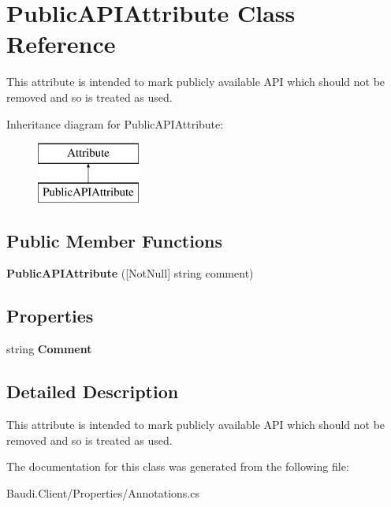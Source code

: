 \hypertarget{class_public_a_p_i_attribute}{}\section{Public\+A\+P\+I\+Attribute Class Reference}
\label{class_public_a_p_i_attribute}


This attribute is intended to mark publicly available A\+P\+I which should not be removed and so is treated as used.  


Inheritance diagram for Public\+A\+P\+I\+Attribute\+:\begin{figure}[H]
\begin{center}
\leavevmode
\includegraphics[height=2.000000cm]{class_public_a_p_i_attribute}
\end{center}
\end{figure}
\subsection*{Public Member Functions}
\begin{DoxyCompactItemize}
\item 
\hypertarget{class_public_a_p_i_attribute_ab00ffb9ccf468541a8f81f85fdee678a}{}{\bfseries Public\+A\+P\+I\+Attribute} (\mbox{[}Not\+Null\mbox{]} string comment)\label{class_public_a_p_i_attribute_ab00ffb9ccf468541a8f81f85fdee678a}

\end{DoxyCompactItemize}
\subsection*{Properties}
\begin{DoxyCompactItemize}
\item 
\hypertarget{class_public_a_p_i_attribute_a4488351c8b5d0090c2bf8d69380acf6a}{}string {\bfseries Comment}\label{class_public_a_p_i_attribute_a4488351c8b5d0090c2bf8d69380acf6a}

\end{DoxyCompactItemize}


\subsection{Detailed Description}
This attribute is intended to mark publicly available A\+P\+I which should not be removed and so is treated as used. 



The documentation for this class was generated from the following file\+:\begin{DoxyCompactItemize}
\item 
Baudi.\+Client/\+Properties/Annotations.\+cs\end{DoxyCompactItemize}
